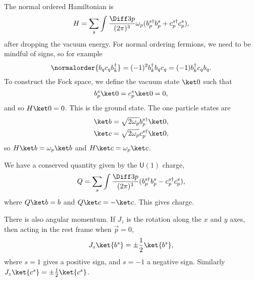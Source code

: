 \documentclass[12pt]{article}
\begin{document}

The normal ordered Hamiltonian is
\[
H = \sum_s \int \frac{\Diff 3 p}{(2 \pi)^3} \omega_p (b_p^{s\dagger} b_p^{s} + c_p^{s\dagger} c_p^{s}),
\]
after dropping the vacuum energy. For normal ordering fermions, we need to be mindful of signs, so for example
\[
\normalorder{b_q c_q b_k^{\dagger}} = (-1)^2 b_k^{\dagger} b_q c_q = (-1) b_k^{\dagger} c_q b_q.
\]
To construct the Fock space, we define the vacuum state $\ket 0$ such that
\[
b_p^{s} \ket 0 = c_p^{s} \ket 0 = 0,
\]
and so $H \ket 0 = 0$. This is the ground state. The one particle states are
\begin{align*}
	\ket b &= \sqrt{2\omega_p} b_p^{s\dagger} \ket 0, \\
	\ket c &= \sqrt{2 \omega_p} c_p^{s\dagger} \ket 0,
\end{align*}
so $H \ket b = \omega_p \ket b$ and $H \ket c = \omega_p \ket c$.

We have a conserved quantity given by the $\mathsf{U}(1)$ charge,
\[
Q = \sum_s \int \frac{\Diff 3 p}{(2 \pi)^3}(b_p^{s\dagger} b_p^{s} - c_p^{s\dagger} c_p^{s}),
\]
where $Q \ket b = b$ and $Q \ket c = - \ket c$. This gives charge.

There is also angular momentum. If $J_z$ is the rotation along the $x$ and $y$ axes, then acting in the rest frame when $\overrightarrow p = 0$,
\[
	J_z \ket{b^{s}} = \pm \frac 12 \ket{b^{s}},
\]
where $s = 1$ gives a positive sign, and $s = -1$ a negative sign. Similarly $J_z \ket {c^{s}} = \pm \frac{1}{2} \ket {c^{s}}$.
\end{document}
